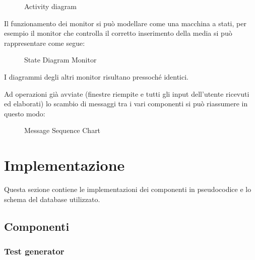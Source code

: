 \documentclass{article}
\begin{document}
\vspace{10pt}

\begin{figure}[H]
	\centering
	
	\caption{Activity diagram}
	\label{fig:activity.svg}
\end{figure}

\newpage

Il funzionamento dei monitor si può modellare come una macchina a stati,
per esempio il monitor che controlla il corretto inserimento della media si 
può rappresentare come segue:

\vspace{12pt}

\begin{figure}[ht]
	
	\caption{State Diagram Monitor}
	\label{fig:state_diagram_monitor.svg}
\end{figure}

\vspace{12pt}

I diagrammi degli altri monitor risultano pressoché identici.

\newpage

Ad operazioni già avviate (finestre riempite e tutti gli input dell'utente ricevuti ed elaborati) lo scambio di messaggi tra i vari componenti si può riassumere in questo 
modo:

\vspace{12pt}

\begin{figure}[ht]
	\centering
	
	\caption{Message Sequence Chart}
	\label{fig:msc.svg}
\end{figure}

\newpage

\section{Implementazione}

Questa sezione contiene le implementazioni dei componenti in pseudocodice e lo schema del database utilizzato.

\subsection{Componenti}

\subsubsection{Test generator}
\end{document}
